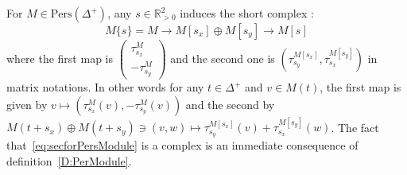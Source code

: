 \documentclass[a4paper, english, 11pt]{article}
\newcommand{\0}{\vec{0}}
\newcommand{\R}[0]{\mathbb{R}}
\newcommand{\Pers}[0]{\text{Pers}}
\begin{document}
\smallskip

For $M\in \Pers(\Delta^+)$, any $s\in\R^2_{>0} $ induces the short complex : 
\begin{equation}\label{eq:secforPersModule}
M\{s\} = M \longrightarrow M[s_x]\oplus M[s_y] \longrightarrow M[s] 
\end{equation}
where the first map is $\left( \begin{array}{c} \tau^M_{s_x}\\ -\tau^M_{s_y}\end{array}\right)$ and the second one is $(\tau^{M[s_x]}_{s_y}, \tau^{M[s_y]}_{s_x})$ in matrix notations. In other words for any $t\in \Delta^+$ and  $v\in M(t)$, the first map is given by $v\mapsto (\tau^M_{s_x}(v), - \tau^M_{s_y}(v))$ and the second by 
$M(t+s_x)\oplus M(t+s_y) \ni (v,w) \mapsto \tau^{M[s_x]}_{s_y}(v)+\tau^{M[s_y]}_{s_x}(w)$. 
The fact that~\eqref{eq:secforPersModule} is a complex is an immediate consequence of definition~\ref{D:PerModule}.
\end{document}

